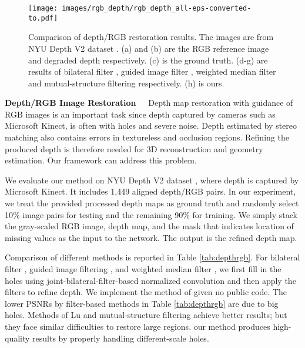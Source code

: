 \documentclass[10pt,twocolumn,letterpaper]{article}
\begin{document}
\begin{figure*}[t]
\centering
\texttt{[image: images/rgb\_depth/rgb\_depth\_all-eps-converted-to.pdf]}\\
\caption{Comparison of depth/RGB restoration results. The images are from NYU Depth V2
dataset \cite{SilbermanHKF12}. (a) and (b) are the RGB reference image and degraded depth
respectively. (c) is the ground truth. (d-g) are results of bilateral filter
\cite{TomasiM98}, guided image filter \cite{HeST10}, weighted median filter
\cite{ZhangXJ14} and mutual-structure filtering \cite{ShenZXJ15} respectively. (h) is
ours.} \label{fig:rgbdepth}
\end{figure*}

\vspace{0.1in}\noindent\textbf{Depth/RGB Image Restoration~~} Depth map restoration with
guidance of RGB images is an important task since depth captured by cameras such as
Microsoft Kinect, is often with holes and severe noise. Depth estimated by stereo
matching also contains errors in textureless and occlusion regions. Refining the produced
depth is therefore needed for 3D reconstruction and geometry estimation. Our framework
can address this problem.

We evaluate our method on NYU Depth V2 dataset \cite{SilbermanHKF12}, where depth is
captured by Microsoft Kinect. It includes 1,449 aligned depth/RGB pairs. In our
experiment, we treat the provided processed depth maps as ground truth and randomly
select 10\% image pairs for testing and the remaining 90\% for training. We simply stack
the gray-scaled RGB image, depth map, and the mask that indicates location of missing
values as the input to the network. The output is the refined depth map.

Comparison of different methods is reported in Table \ref{tab:depthrgb}. For bilateral
filter \cite{TomasiM98}, guided image filtering \cite{HeST10}, and weighted median filter
\cite{ZhangXJ14}, we first fill in the holes using joint-bilateral-filter-based
normalized convolution \cite{KnutssonW93} and then apply the filters to refine depth. We
implement the method of \cite{LuRL14} given no public code. The lower PSNRs by
filter-based methods in Table \ref{tab:depthrgb} are due to big holes. Methods of Lu
\etal \cite{LuRL14} and mutual-structure filtering \cite{ShenZXJ15} achieve better
results; but they face similar difficulties to restore large regions. our method produces
high-quality results by properly handling different-scale holes.
\end{document}
